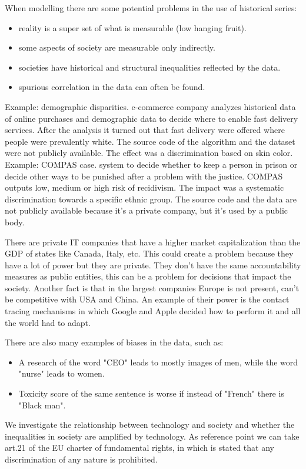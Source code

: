 When modelling there are some potential problems in the use of historical series:
\begin{itemize}
    \item reality is a super set of what is measurable (low hanging fruit).
    \item some aspects of society are measurable only indirectly.
    \item societies have historical and structural inequalities reflected by the data.
    \item spurious correlation in the data can often be found.
\end{itemize}
Example: demographic disparities. e-commerce company analyzes historical data of online purchases and demographic data to decide where to enable fast delivery services. After the analysis it turned out that fast delivery were offered where people were prevalently white. The source code of the algorithm and the dataset were not publicly available. The effect was a discrimination based on skin color.\\
Example: COMPAS case. system to decide whether to keep a person in prison or decide other ways to be punished after a problem with the justice. COMPAS outputs low, medium or high risk of recidivism. The impact was a systematic discrimination towards a specific ethnic group. The source code and the data are not publicly available because it's a private company, but it's used by a public body.

There are private IT companies that have a higher market capitalization than the GDP of states like Canada, Italy, etc. This could create a problem because they have a lot of power but they are private. They don't have the same accountability measures as public entities, this can be a problem for decisions that impact the society. Another fact is that in the largest companies Europe is not present, can't be competitive with USA and China. 
An example of their power is the contact tracing mechanisms in which Google and Apple decided how to perform it and all the world had to adapt.

There are also many examples of biases in the data, such as:
\begin{itemize}
    \item A research of the word "CEO" leads to mostly images of men, while the word "nurse" leads to women.
    \item Toxicity score of the same sentence is worse if instead of "French" there is "Black man".
\end{itemize}
We investigate the relationship between technology and society and whether the inequalities in society are amplified by technology. As reference point we can take art.21 of the EU charter of fundamental rights, in which is stated that any discrimination of any nature is prohibited.

